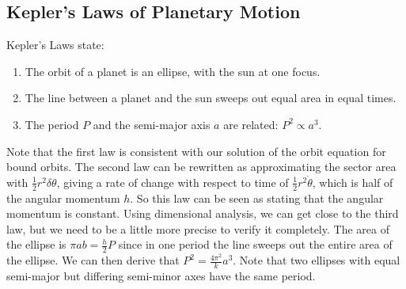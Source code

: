 \subsection{Kepler's Laws of Planetary Motion}
Kepler's Laws state:
\begin{enumerate}
	\item The orbit of a planet is an ellipse, with the sun at one focus.
	\item The line between a planet and the sun sweeps out equal area in equal times.
	\item The period \(P\) and the semi-major axis \(a\) are related: \(P^2 \propto a^3\).
\end{enumerate}
Note that the first law is consistent with our solution of the orbit equation for bound orbits. The second law can be rewritten as approximating the sector area with \(\frac{1}{2}r^2\delta\theta\), giving a rate of change with respect to time of \(\frac{1}{2}r^2\dot\theta\), which is half of the angular momentum \(h\). So this law can be seen as stating that the angular momentum is constant. Using dimensional analysis, we can get close to the third law, but we need to be a little more precise to verify it completely. The area of the ellipse is \(\pi a b = \frac{h}{2}P\) since in one period the line sweeps out the entire area of the ellipse. We can then derive that \(P^2 = \frac{4\pi^2}{k}a^3\). Note that two ellipses with equal semi-major but differing semi-minor axes have the same period.
